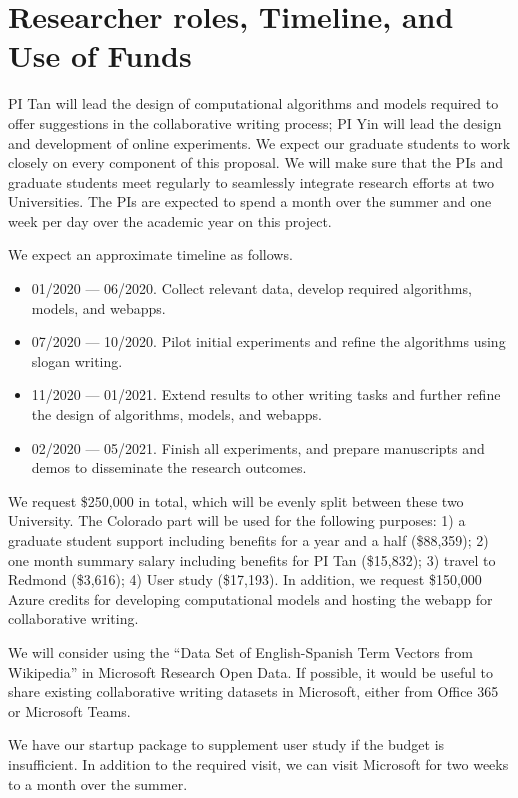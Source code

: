 
\section{Researcher roles, Timeline, and Use of Funds}

PI Tan will lead the design of computational algorithms and models required to offer suggestions in the collaborative writing process;
PI Yin will lead the design and development of online experiments.
We expect our graduate students to work closely on every component of this proposal.
We will make sure that the PIs and graduate students meet regularly to seamlessly integrate research efforts at two Universities.
The PIs are expected to spend a month over the summer and one week per day over the academic year on this project.


 We expect an approximate timeline as follows.

\begin{itemize}[leftmargin=*,noitemsep,topsep=0pt,parsep=0pt,partopsep=0pt]
    \item 01/2020 --- 06/2020. Collect relevant data, develop required algorithms, models, and webapps.
    \item 07/2020 --- 10/2020. Pilot initial experiments and refine the algorithms using slogan writing.
    \item 11/2020 --- 01/2021. Extend results to other writing tasks and further refine the design of algorithms, models, and webapps.
    \item 02/2020 --- 05/2021. Finish all experiments, and prepare manuscripts and demos to disseminate the research outcomes.
\end{itemize}

 We request \$250,000 in total, which will be evenly split between these two University.
The Colorado part will be used for the following purposes:
1) a graduate student support including benefits for a year and a half (\$88,359);
2) one month summary salary including benefits for PI Tan (\$15,832);
3) travel to Redmond (\$3,616);
4) User study (\$17,193).
In addition, we request \$150,000 Azure credits for developing computational models and hosting the webapp for collaborative writing.


 We will consider using the ``Data Set of English-Spanish Term Vectors from Wikipedia'' in Microsoft Research Open Data. 
If possible, it would be useful to share existing collaborative writing datasets in Microsoft, either from Office 365 or Microsoft Teams.

We have our startup package to supplement user study if the budget is insufficient.
In addition to the required visit, we can visit Microsoft for two weeks to a month over the summer.

